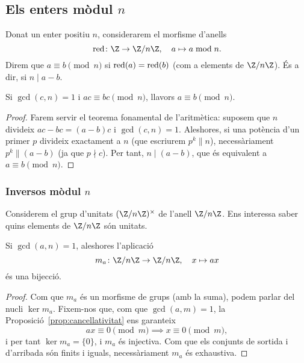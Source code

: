  \subsection{Els enters mòdul \texorpdfstring{$n$}{n}}
 Donat un enter positiu $n$, considerarem el morfisme d'anells
 \[
 \red\colon \Z\to\Z/n\Z,\quad a\mapsto a\bmod{n}.
 \]
 Direm que $a\equiv b\pmod{n}$ si $\operatorname{red}(a)=\operatorname{red}(b)$ (com a elements de $\Z/n\Z$). És a dir, si $n\mid a-b$.
 
 \begin{proposition}
 \label{prop:cancellativitat}
 Si $\gcd(c,n)=1$ i $ac\equiv bc\pmod{n}$, llavors $a\equiv b\pmod{n}$.
 \end{proposition}
\begin{proof}
 Farem servir el teorema fonamental de l'aritmètica: suposem que $n$ divideix $ac-bc = (a-b)c$ i $\gcd(c,n)=1$. Aleshores, si una potència d'un primer $p$ divideix exactament a $n$ (que escriurem $p^k\parallel n$), necessàriament $p^k\parallel (a-b)$ (ja que $p\nmid c$). Per tant, $n\mid (a-b)$, que és equivalent a $a\equiv b\pmod n$.
\end{proof}
 \subsubsection{Inversos mòdul \texorpdfstring{$n$}{n}}
 Considerem el grup d'unitats $(\Z/n\Z)^\times$ de l'anell $\Z/n\Z$. Ens interessa saber quins elements de $\Z/n\Z$ són unitats.
 
 
 \begin{proposition}
 Si $\gcd(a,n)=1$, aleshores l'aplicació
 \[
 m_a\colon \Z/n\Z\to\Z/n\Z,\quad x\mapsto ax
 \]
 és una bijecció.
 \end{proposition}
 \begin{proof}
Com que $m_a$ és un morfisme de grups (amb la suma), podem parlar del nucli $\ker m_a$. Fixem-nos que, com que $\gcd(a,m)=1$, la Proposició~\ref{prop:cancellativitat} ens garanteix
\[
ax\equiv 0\pmod{m}\implies x\equiv 0\pmod{m},
\]
i per tant $\ker m_a=\{0\}$, i $m_a$ és injectiva. Com que els conjunts de sortida i d'arribada són finits i iguals, necessàriament $m_a$ és exhaustiva.
 \end{proof}
 

